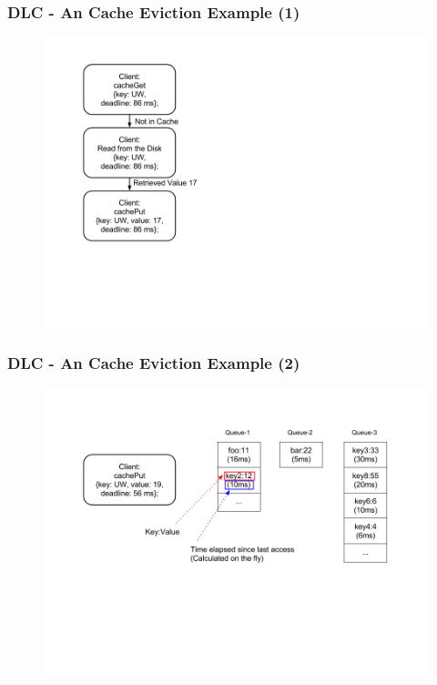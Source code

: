 \documentclass{beamer}
\begin{document}
\begin{frame}
  \frametitle{DLC - An Cache Eviction Example (1)}
  \begin{figure}
    \begin{center}
      \centerline{\includegraphics[scale=0.33]{img/DLC1.png}}
    \end{center}
  \end{figure}
\end{frame}


\begin{frame}
  \frametitle{DLC - An Cache Eviction Example (2)}
  \begin{figure}
    \begin{center}
      \centerline{\includegraphics[scale=0.33]{img/DLC_NEW_2.png}}
    \end{center}
  \end{figure}
\end{frame}
\end{document}
